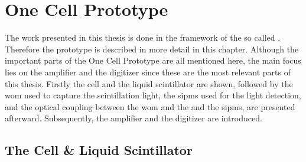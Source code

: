 \chapter{One Cell Prototype}

The work presented in this thesis is done in the framework of the so called .
Therefore the prototype is described in more detail in this chapter.
Although the important parts of the One Cell Prototype are all mentioned here, the main focus lies on the amplifier and the digitizer since these are the most relevant parts of this thesis.
Firstly the cell and the liquid scintillator are shown, followed by the \ac{wom} used to capture the scintillation light, the \acp{sipm} used for the light detection, and the optical coupling between the \ac{wom} and the and the \acp{sipm}, are presented afterward.
Subsequently, the amplifier and the digitizer are introduced.



\section{The Cell \& Liquid Scintillator}

